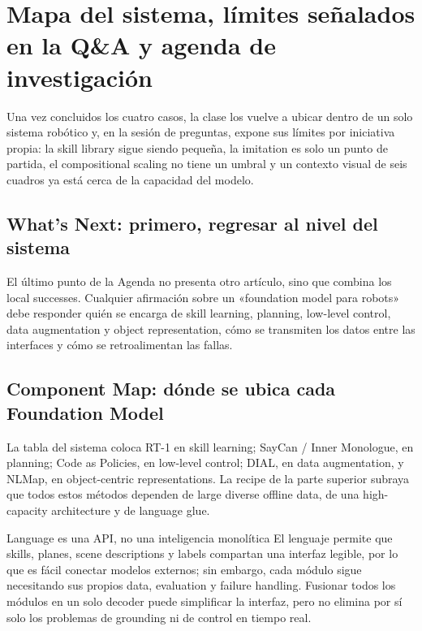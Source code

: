 \section{Mapa del sistema, límites señalados en la Q\&A y agenda de investigación}

Una vez concluidos los cuatro casos, la clase los vuelve a ubicar dentro de un solo sistema robótico y, en la sesión de preguntas, expone sus límites por iniciativa propia: la skill library sigue siendo pequeña, la imitation es solo un punto de partida, el compositional scaling no tiene un umbral y un contexto visual de seis cuadros ya está cerca de la capacidad del modelo.

\subsection{What's Next: primero, regresar al nivel del sistema}

El último punto de la Agenda no presenta otro artículo, sino que combina los local successes. Cualquier afirmación sobre un «foundation model para robots» debe responder quién se encarga de skill learning, planning, low-level control, data augmentation y object representation, cómo se transmiten los datos entre las interfaces y cómo se retroalimentan las fallas.


\subsection{Component Map: dónde se ubica cada Foundation Model}

La tabla del sistema coloca RT-1 en skill learning; SayCan / Inner Monologue, en planning; Code as Policies, en low-level control; DIAL, en data augmentation, y NLMap, en object-centric representations. La recipe de la parte superior subraya que todos estos métodos dependen de large diverse offline data, de una high-capacity architecture y de language glue.


\begin{importantbox}{Language es una API, no una inteligencia monolítica}
El lenguaje permite que skills, planes, scene descriptions y labels compartan una interfaz legible, por lo que es fácil conectar modelos externos; sin embargo, cada módulo sigue necesitando sus propios data, evaluation y failure handling. Fusionar todos los módulos en un solo decoder puede simplificar la interfaz, pero no elimina por sí solo los problemas de grounding ni de control en tiempo real.
\end{importantbox}

